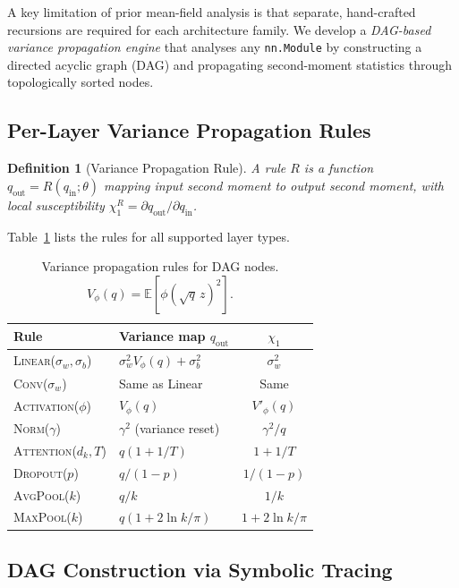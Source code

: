 \documentclass[10pt]{article}
\newcommand{\EE}{\mathbb{E}}
\newtheorem{definition}[theorem]{Definition}
\begin{document}
A key limitation of prior mean-field analysis is that separate, hand-crafted recursions are required for each architecture family.
We develop a \emph{DAG-based variance propagation engine} that analyses any \texttt{nn.Module} by constructing a directed acyclic graph (DAG) and propagating second-moment statistics through topologically sorted nodes.

\subsection{Per-Layer Variance Propagation Rules}

\begin{definition}[Variance Propagation Rule]
\label{def:var-rule}
A rule $R$ is a function $q_{\mathrm{out}} = R(q_{\mathrm{in}}; \theta)$ mapping input second moment to output second moment, with local susceptibility $\chi_1^R = \partial q_{\mathrm{out}}/\partial q_{\mathrm{in}}$.
\end{definition}

Table~\ref{tab:rules} lists the rules for all supported layer types.

\begin{table}[t]
\centering
\caption{Variance propagation rules for DAG nodes. $V_\phi(q) = \EE[\phi(\sqrt{q}\,z)^2]$.}
\label{tab:rules}
\small
\begin{tabular}{@{}llc@{}}
\toprule
\textbf{Rule} & \textbf{Variance map $q_{\mathrm{out}}$} & $\chi_1$ \\
\midrule
\textsc{Linear}($\sigma_w, \sigma_b$) & $\sigma_w^2 V_\phi(q) + \sigma_b^2$ & $\sigma_w^2$ \\
\textsc{Conv}($\sigma_w$) & Same as Linear & Same \\
\textsc{Activation}($\phi$) & $V_\phi(q)$ & $V'_\phi(q)$ \\
\textsc{Norm}($\gamma$) & $\gamma^2$ (variance reset) & $\gamma^2/q$ \\
\textsc{Attention}($d_k, T$) & $q(1 + 1/T)$ & $1 + 1/T$ \\
\textsc{Dropout}($p$) & $q/(1\!-\!p)$ & $1/(1\!-\!p)$ \\
\textsc{AvgPool}($k$) & $q/k$ & $1/k$ \\
\textsc{MaxPool}($k$) & $q(1 + 2\ln k/\pi)$ & $1+2\ln k/\pi$ \\
\bottomrule
\end{tabular}
\end{table}

\subsection{DAG Construction via Symbolic Tracing}
\end{document}
